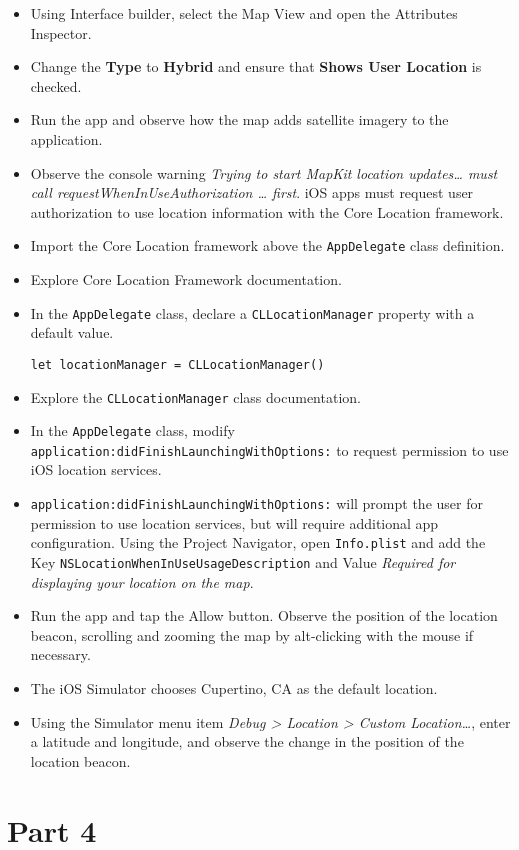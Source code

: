 \documentclass[a4paper,11pt]{scrartcl}
\begin{document}
\begin{itemize}
\item Using Interface builder, select the Map View and open the Attributes Inspector.
\item Change the \textbf{Type} to \textbf{Hybrid} and ensure that \textbf{Shows User Location} is checked.
\item Run the app and observe how the map adds satellite imagery to the application.
\item Observe the console warning \textit{Trying to start MapKit location updates… must call requestWhenInUseAuthorization … first}. iOS apps must request user authorization to use location information with the Core Location framework.
\item Import the Core Location framework above the \texttt{AppDelegate} class definition.
\item Explore Core Location Framework documentation.
\item In the \texttt{AppDelegate} class, declare a \texttt{CLLocationManager} property with a default value.
\begin{lstlisting}
let locationManager = CLLocationManager()
\end{lstlisting}
\item Explore the \texttt{CLLocationManager} class documentation.
\item In the \texttt{AppDelegate} class, modify \texttt{application:didFinishLaunchingWithOptions:} to request permission to use iOS location services.
\item \texttt{application:didFinishLaunchingWithOptions:} will prompt the user for permission to use location services, but will require additional app configuration. Using the Project Navigator, open \texttt{Info.plist} and add the Key \texttt{NSLocationWhenInUseUsageDescription} and Value \textit{Required for displaying your location on the map}.
\item Run the app and tap the Allow button. Observe the position of the location beacon, scrolling and zooming the map by alt-clicking with the mouse if necessary.
\item The iOS Simulator chooses Cupertino, CA as the default location.
\item Using the Simulator menu item \textit{Debug > Location > Custom Location…}, enter a latitude and longitude, and observe the change in the position of the location beacon.
\end{itemize}

\section*{Part 4}
\end{document}
